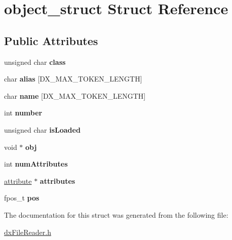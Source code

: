 \hypertarget{structobject__struct}{
\section{object\_\-struct Struct Reference}
\label{structobject__struct}
}
\subsection*{Public Attributes}
\begin{DoxyCompactItemize}
\item 
\hypertarget{structobject__struct_ac7f622e3649ce9c2ed08884b43e6cc69}{
unsigned char {\bfseries class}}
\label{structobject__struct_ac7f622e3649ce9c2ed08884b43e6cc69}

\item 
\hypertarget{structobject__struct_a5904bec038a2d1084ca5502849c91bed}{
char {\bfseries alias} \mbox{[}DX\_\-MAX\_\-TOKEN\_\-LENGTH\mbox{]}}
\label{structobject__struct_a5904bec038a2d1084ca5502849c91bed}

\item 
\hypertarget{structobject__struct_a272c020b374dfb611b810497f576db58}{
char {\bfseries name} \mbox{[}DX\_\-MAX\_\-TOKEN\_\-LENGTH\mbox{]}}
\label{structobject__struct_a272c020b374dfb611b810497f576db58}

\item 
\hypertarget{structobject__struct_a09add94d7dd7fc55475a69146648fd99}{
int {\bfseries number}}
\label{structobject__struct_a09add94d7dd7fc55475a69146648fd99}

\item 
\hypertarget{structobject__struct_a68914a2c17d3532330b6d08381640f83}{
unsigned char {\bfseries isLoaded}}
\label{structobject__struct_a68914a2c17d3532330b6d08381640f83}

\item 
\hypertarget{structobject__struct_a5632bf423da713ab3cd3de7f0a6faccc}{
void $\ast$ {\bfseries obj}}
\label{structobject__struct_a5632bf423da713ab3cd3de7f0a6faccc}

\item 
\hypertarget{structobject__struct_a1d0fd34a2ffb9797ded7459310d37482}{
int {\bfseries numAttributes}}
\label{structobject__struct_a1d0fd34a2ffb9797ded7459310d37482}

\item 
\hypertarget{structobject__struct_a71fc740435b0c38299b42850605422ba}{
\hyperlink{structattribute__struct}{attribute} $\ast$ {\bfseries attributes}}
\label{structobject__struct_a71fc740435b0c38299b42850605422ba}

\item 
\hypertarget{structobject__struct_a4a7771392652365158b71ac4825ecc37}{
fpos\_\-t {\bfseries pos}}
\label{structobject__struct_a4a7771392652365158b71ac4825ecc37}

\end{DoxyCompactItemize}


The documentation for this struct was generated from the following file:\begin{DoxyCompactItemize}
\item 
\hyperlink{dxFileReader_8h}{dxFileReader.h}\end{DoxyCompactItemize}
